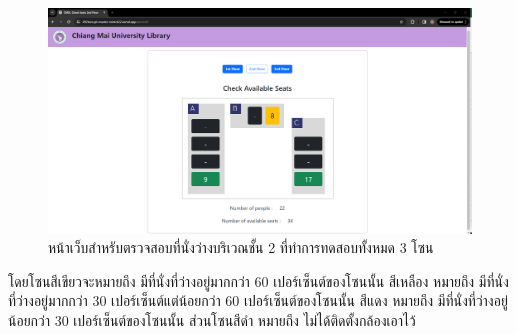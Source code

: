 \begin{figure}[h]
    \centering
    \includegraphics[width=\textwidth]{images/web2.png}
    \caption[หน้าเว็บสำหรับตรวจสอบที่นั่งว่างบริเวณชั้น 2 ที่ทำการทดสอบทั้งหมด 3 โซน]{หน้าเว็บสำหรับตรวจสอบที่นั่งว่างบริเวณชั้น 2 ที่ทำการทดสอบทั้งหมด 3 โซน}
    \label{fig:web1}
\end{figure}
โดยโซนสีเขียวจะหมายถึง มีที่นั่งที่ว่างอยู่มากกว่า 60 เปอร์เซ็นต์ของโซนนั้น สีเหลือง หมายถึง มีที่นั่งที่ว่างอยู่มากกว่า 30 เปอร์เซ็นต์แต่น้อยกว่า 60 เปอร์เซ็นต์ของโซนนั้น สีแดง หมายถึง มีที่นั่งที่ว่างอยู่น้อยกว่า 30 เปอร์เซ็นต์ของโซนนั้น ส่วนโซนสีดำ หมายถึง ไม่ได้ติดตั้งกล้องเอาไว้
